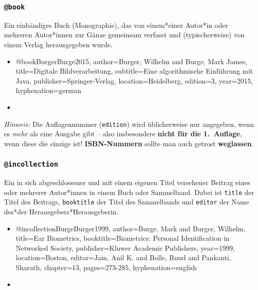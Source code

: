 \subsubsection{\texttt{@book}}
\label{sec:@book}
Ein einbändiges Buch (Monographie), das von einem*einer Autor*in oder mehreren Autor*innen zur Gänze gemeinsam verfasst und (typischerweise) von einem Verlag herausgegeben wurde.
% 
\begin{itemize}
\item[] 
\begin{GenericCode}[numbers=none]
@book{BurgerBurge2015,
  author={Burger, Wilhelm and Burge, Mark James},
  title={Digitale Bildverarbeitung},
  subtitle={Eine algorithmische Einführung mit Java},
  publisher={Springer-Verlag},
  location={Heidelberg},
  edition={3},
  year={2015},
  hyphenation={german}
}
\end{GenericCode}
\item[\cite{BurgerBurge2015}] 
\end{itemize}
%
\emph{Hinweis:} Die Auflagennummer (\texttt{edition}) wird üblicherweise nur angegeben, 
wenn es \emph{mehr} als eine Ausgabe gibt -- also insbesondere \textbf{nicht für die 1.\ Auflage}, 
wenn diese die einzige ist!
\textbf{ISBN-Nummern} sollte man auch getrost \textbf{weglassen}.


\subsubsection{\texttt{@incollection}}
\label{sec:@incollection}
Ein in sich abgeschlossener und mit einem eigenen Titel versehener
Beitrag eines oder mehrerer Autor*innen in einem Buch oder Sammelband.
Dabei ist \texttt{title} der Titel des Beitrags, \texttt{booktitle} der Titel des Sammelbands und
\texttt{editor} der Name des*der Herausgebers*Herausgeberin.
%
\begin{itemize}
\item[] 
\begin{GenericCode}[numbers=none]
@incollection{BurgeBurger1999,
  author={Burge, Mark and Burger, Wilhelm},
  title={Ear Biometrics},
  booktitle={Biometrics: Personal Identification in Networked Society},
  publisher={Kluwer Academic Publishers},
  year={1999},
  location={Boston},
  editor={Jain, Anil K. and Bolle, Ruud and Pankanti, Sharath},
  chapter={13},
  pages={273-285},
  hyphenation={english}
}
\end{GenericCode}
\item[\cite{BurgeBurger1999}] 
\end{itemize}


